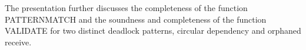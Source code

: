 The presentation further discusses the completeness of the function \textrm{PATTERNMATCH} and the soundness and completeness of the function \textrm{VALIDATE} for two distinct deadlock patterns, circular dependency and orphaned receive. 

\begin{comment}
The completeness proof for the abstract machine in \figref{fig:machine} is given in \lemmaref{lemma:complete}.
This proof assumes that the function \textrm{PATTERNMATCH} detects all the instances for a particular pattern. This assumption is proved for the circular dependency pattern and the orphaned receive pattern latter sections. 

\begin{lemma}[Completeness for Feasible Check]
  The machine implementing \textrm{FEASIBLECHECK} is sound for a given pattern instance in that only a program with no deadlock on that instance is accepted; thus, it may reject some programs as having a deadlock on an instance when in fact they do not.
  
  The machine implementing \textrm{FEASIBLECHECK} is sound for a given pattern instance in that it may reject a program as having a deadlock on that instance when in fact it does not.
  
For any single-path MPI program, \textit{ctp}, any feasible schedule for a deadlock pattern instance is demonstrated by the function \textrm{FEASIBLECHECK} in \algoref{algo:main}. 
\label{lemma:complete}
\end{lemma}
\begin{proof}
Proof by showing that the abstract machine in \figref{fig:machine} simulates the message communication under infinite buffer semantics. For the \emph{Sndi Command} and \emph{Rcvi Command} rules, a send or receive is consumed immediately and two structures $\epsnd$ and $\epwait$, respectively, are updated. This is consistent with the issuing of send and receive under infinite buffer semantics. The three cases of \emph{Wait Command} witness the completion of the receives that are not in the pattern $\mathit{pt}$ and intend to get to the receives in $\mathit{pt}$. The two cases of \emph{Barrier Command} block the execution of a member process until all the barriers in the group are witnessed. Since the abstract machine in \figref{fig:machine} is able to simulate the behavior for infinite buffer semantics, any feasible schedule should be demonstrated by executing \textit{ctp} on the machine.
\end{proof}
\end{comment}
